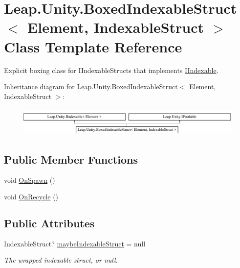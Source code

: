 \hypertarget{class_leap_1_1_unity_1_1_boxed_indexable_struct}{}\section{Leap.\+Unity.\+Boxed\+Indexable\+Struct$<$ Element, Indexable\+Struct $>$ Class Template Reference}
\label{class_leap_1_1_unity_1_1_boxed_indexable_struct}


Explicit boxing class for I\+Indexable\+Structs that implements \mbox{\hyperlink{interface_leap_1_1_unity_1_1_i_indexable}{I\+Indexable}}.  


Inheritance diagram for Leap.\+Unity.\+Boxed\+Indexable\+Struct$<$ Element, Indexable\+Struct $>$\+:\begin{figure}[H]
\begin{center}
\leavevmode
\includegraphics[height=1.513514cm]{class_leap_1_1_unity_1_1_boxed_indexable_struct}
\end{center}
\end{figure}
\subsection*{Public Member Functions}
\begin{DoxyCompactItemize}
\item 
void \mbox{\hyperlink{class_leap_1_1_unity_1_1_boxed_indexable_struct_a3742788d7d9267dbb858f26da1129702}{On\+Spawn}} ()
\item 
void \mbox{\hyperlink{class_leap_1_1_unity_1_1_boxed_indexable_struct_aa8fe681e5cd7eb74d91af8fb2d950fe7}{On\+Recycle}} ()
\end{DoxyCompactItemize}
\subsection*{Public Attributes}
\begin{DoxyCompactItemize}
\item 
Indexable\+Struct? \mbox{\hyperlink{class_leap_1_1_unity_1_1_boxed_indexable_struct_a84590ff61c55ba6fd94bf40eb47e38f1}{maybe\+Indexable\+Struct}} = null
\begin{DoxyCompactList}\small\item\em The wrapped indexable struct, or null. \end{DoxyCompactList}\end{DoxyCompactItemize}
